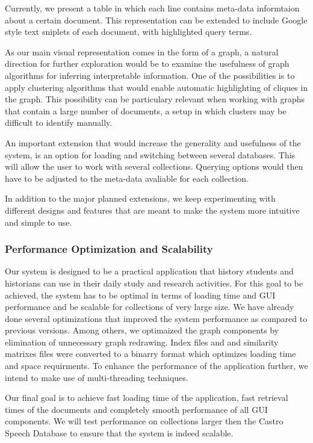 Currently, we present a table in which each line contains meta-data informtaion about a certain document. This representation can be extended
to include Google style text sniplets of each document, with highlighted query terms.

As our main visual representation comes in the form of a graph, a natural direction for further exploration would be to examine the usefulness of 
graph algorithms for inferring interpretable information. One of the possibilities is to apply clustering algorithms 
that would enable automatic highlighting of cliques in the graph. This possibility can be particulary relevant when working with graphs that 
contain a large number of documents, a setup in which clusters may be difficult to identify manually. 

An important extension that would increase the generality and usefulness of the system, 
is an option for loading and switching between several databases. This will allow the user to work with several collections. Querying options
would then have to be adjusted to the meta-data avaliable for each collection.

In addition to the major planned extensions, we keep experimenting with different designs and features that are meant to make the
system more intuitive and simple to use. 

\subsubsection{Performance Optimization and Scalability}
Our system is designed to be a practical application that history students and historians can use in their daily study and research activities.
For this goal to be achieved, the system has to be optimal in terms of loading time and GUI performance and be scalable for collections 
of very large size. We have already done several optimizations that improved the system performance as compared to
previous versions. Among others, we optimaized the graph components by elimination of unnecessary graph redrawing. 
Index files and and similarity matrixes files were converted to a binarry format which optimizes loading time and space requirments. 
To enhance the performance of the application further, we intend to make use of multi-threading techniques. 

Our final goal is to achieve fast loading time of the application, fast retrieval times of the documents and completely 
smooth performance of all GUI components. We will test performance on collections larger then the Castro Speech Database to ensure
that the system is indeed scalable.    

